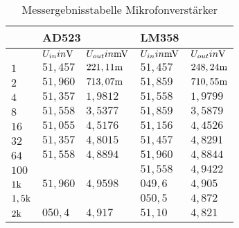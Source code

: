 \begin{table}[H]
\centering
\caption{Messergebnisstabelle Mikrofonverstärker}
\label{tab:Mikrofon_erg_tab}
\begin{tabular}{l||l|l||l|l|}
\cline{2-5}
                                                & \multicolumn{2}{l||}{AD523} & \multicolumn{2}{l|}{LM358} \\ \hline
\rowcolor[HTML]{C0C0C0} 
\multicolumn{1}{|l||}{\cellcolor[HTML]{C0C0C0}$f{ in }\Hz$} &$ U_{in}{ in }\text{V}       $&$ U_{out}{ in }\text{mV}     $&$ U_{in}{ in }\text{mV}        $&$ U_{out}{ in }\text{V}   $\\ \hline
\multicolumn{1}{|l||}{$1$}                         &$ 51,457    $&$ 221,11\text{m}   $&$ 51,457   $&$ 248,24\text{m}    $\\ \hline
\multicolumn{1}{|l||}{$2$}                         &$ 51,960    $&$ 713,07\text{m}   $&$ 51,859   $&$ 710,55\text{m}    $\\ \hline
\multicolumn{1}{|l||}{$4$}                         &$ 51,357    $&$ 1,9812      $&$ 51,558   $&$ 1,9799       $\\ \hline
\multicolumn{1}{|l||}{$8$}                         &$ 51,558    $&$ 3,5377      $&$ 51,859   $&$ 3,5879       $\\ \hline
\multicolumn{1}{|l||}{$16$}                        &$ 51,055    $&$ 4,5176      $&$ 51,156   $&$ 4,4526       $\\ \hline
\multicolumn{1}{|l||}{$32$}                        &$ 51,357    $&$ 4,8015      $&$ 51,457   $&$ 4,8291       $\\ \hline
\multicolumn{1}{|l||}{$64$}                        &$ 51,558    $&$ 4,8894      $&$ 51,960   $&$ 4,8844       $\\ \hline
\multicolumn{1}{|l||}{$100$}                       &$              $&$             $&$ 51,558   $&$ 4,9422       $\\ \hline
\multicolumn{1}{|l||}{$1\text{k}$}                       &$ 51,960    $&$ 4,9598      $&$ 049,6    $&$ 4,905        $\\ \hline
\multicolumn{1}{|l||}{$1,5\text{k}$}                     &$              $&$             $&$ 050,5    $&$ 4,872        $\\ \hline
\multicolumn{1}{|l||}{$2\text{k}$}                       &$ 050,4     $&$ 4,917       $&$ 51,10    $&$ 4,821        $\\ \hline

\end{tabular}
\end{table}
